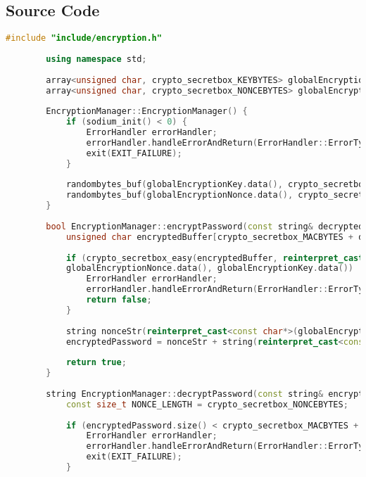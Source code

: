 \documentclass{article}
\begin{document}
	\subsection*{Source Code}
	\begin{mdframed}[backgroundcolor=background, hidealllines=false, innerleftmargin=15pt, innerrightmargin=5pt, innertopmargin=0pt, innerbottommargin=-5pt, linecolor=accent]
	\begin{lstlisting}[language=C++]
		#include "include/encryption.h"
		
		using namespace std;
		
		array<unsigned char, crypto_secretbox_KEYBYTES> globalEncryptionKey;
		array<unsigned char, crypto_secretbox_NONCEBYTES> globalEncryptionNonce;
		
		EncryptionManager::EncryptionManager() {
			if (sodium_init() < 0) {
				ErrorHandler errorHandler;
				errorHandler.handleErrorAndReturn(ErrorHandler::ErrorType::LIBSODIUM_INIT_ERROR);
				exit(EXIT_FAILURE);
			}
			
			randombytes_buf(globalEncryptionKey.data(), crypto_secretbox_KEYBYTES);
			randombytes_buf(globalEncryptionNonce.data(), crypto_secretbox_NONCEBYTES);
		}
		
		bool EncryptionManager::encryptPassword(const string& decryptedPassword, string& encryptedPassword) {
			unsigned char encryptedBuffer[crypto_secretbox_MACBYTES + decryptedPassword.size()];
			
			if (crypto_secretbox_easy(encryptedBuffer, reinterpret_cast<const unsigned char*>(decryptedPassword.c_str()), decryptedPassword.size(),
			globalEncryptionNonce.data(), globalEncryptionKey.data()) != 0) {
				ErrorHandler errorHandler;
				errorHandler.handleErrorAndReturn(ErrorHandler::ErrorType::EMAIL_PASSWORD_ENCRYPTION_ERROR);
				return false;
			}
			
			string nonceStr(reinterpret_cast<const char*>(globalEncryptionNonce.data()), globalEncryptionNonce.size());
			encryptedPassword = nonceStr + string(reinterpret_cast<const char*>(encryptedBuffer), sizeof(encryptedBuffer));
			
			return true;
		}
		
		string EncryptionManager::decryptPassword(const string& encryptedPassword) {
			const size_t NONCE_LENGTH = crypto_secretbox_NONCEBYTES;
			
			if (encryptedPassword.size() < crypto_secretbox_MACBYTES + NONCE_LENGTH) {
				ErrorHandler errorHandler;
				errorHandler.handleErrorAndReturn(ErrorHandler::ErrorType::EMAIL_PASSWORD_ENCRYPTION_FORMAT_ERROR);
				exit(EXIT_FAILURE);
			}
			

\end{lstlisting}
\end{mdframed}
\end{document}
